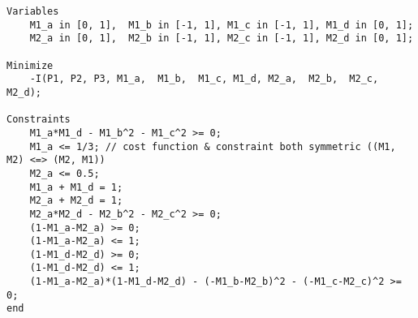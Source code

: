 \begin{lstlisting}[style=CStyle]
Variables
    M1_a in [0, 1],  M1_b in [-1, 1], M1_c in [-1, 1], M1_d in [0, 1];
    M2_a in [0, 1],  M2_b in [-1, 1], M2_c in [-1, 1], M2_d in [0, 1];

Minimize
    -I(P1, P2, P3, M1_a,  M1_b,  M1_c, M1_d, M2_a,  M2_b,  M2_c, M2_d);

Constraints
    M1_a*M1_d - M1_b^2 - M1_c^2 >= 0;
    M1_a <= 1/3; // cost function & constraint both symmetric ((M1, M2) <=> (M2, M1))
    M2_a <= 0.5;
    M1_a + M1_d = 1;
    M2_a + M2_d = 1;
    M2_a*M2_d - M2_b^2 - M2_c^2 >= 0;
    (1-M1_a-M2_a) >= 0;
    (1-M1_a-M2_a) <= 1;
    (1-M1_d-M2_d) >= 0;
    (1-M1_d-M2_d) <= 1;
    (1-M1_a-M2_a)*(1-M1_d-M2_d) - (-M1_b-M2_b)^2 - (-M1_c-M2_c)^2 >= 0;
end
\end{lstlisting}    